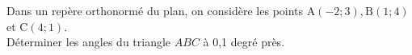 \documentclass[12pt,a4paper]{article}  %
\begin{document}









Dans un repère orthonormé du plan, on considère les points $\mathrm{A}(-2 ;3), \mathrm{B}(1 ; 4)$ et $\mathrm{C}(4 ; 1)$.\\
Déterminer les angles du triangle $A B C$ à 0,1 degré près.\\

\newpage
\end{document}
